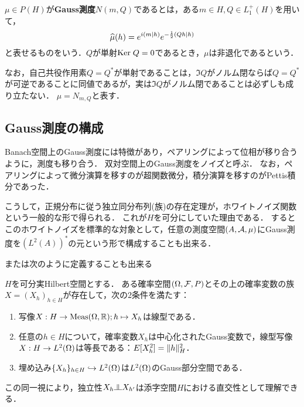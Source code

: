 \documentclass[uplatex,dvipdfmx]{jsreport}
\begin{document}
\begin{definition}
    $\mu\in P(H)$が\textbf{Gauss測度$N(m,Q)$}であるとは，ある$m\in H,Q\in L^+_1(H)$を用いて，
    \[\widehat{\mu}(h)=e^{i(m|h)}e^{-\frac{1}{2}(Qh|h)}\]
    と表せるものをいう．$Q$が単射$\mathrm{Ker}\; Q=0$であるとき，$\mu$は非退化であるという．

    なお，自己共役作用素$Q=Q^*$が単射であることは，$\Im Q$がノルム閉ならば$Q=Q^*$が可逆であることに同値であるが，実は$\Im Q$がノルム閉であることは必ずしも成り立たない．
    $\mu=N_{m,Q}$と表す．
\end{definition}

\subsection{Gauss測度の構成}

\begin{tcolorbox}[colframe=ForestGreen, colback=ForestGreen!10!white,breakable,colbacktitle=ForestGreen!40!white,coltitle=black,fonttitle=\bfseries\sffamily,
title=]
    Banach空間上のGauss測度には特徴があり，ペアリングによって位相が移り合うように，測度も移り合う．
    双対空間上のGauss測度をノイズと呼ぶ．
    なお，ペアリングによって微分演算を移すのが超関数微分，積分演算を移すのがPettis積分であった．

    こうして，正規分布に従う独立同分布列(族)の存在定理が，ホワイトノイズ関数という一般的な形で得られる．
    これが$H$を可分にしていた理由である．
    するとこのホワイトノイズを標準的な対象として，任意の測度空間$(A,\mathcal{A},\mu)$にGauss測度を$(L^2(A))^*$の元という形で構成することも出来る．
\end{tcolorbox}

または次のように定義することも出来る\cite{Revus and Yor}

\begin{proposition}\label{prop-existence-of-noises}
    $H$を可分実Hilbert空間とする．
    ある確率空間$(\Omega,\mathcal{F},P)$とその上の確率変数の族$X=(X_h)_{h\in H}$が存在して，次の2条件を満たす：
    \begin{enumerate}
        \item 写像$X:H\to\mathrm{Meas}(\Omega,\mathbb{R});h\mapsto X_h$は線型である．
        \item 任意の$h\in H$について，確率変数$X_h$は中心化されたGauss変数で，線型写像$X:H\to L^2(\Omega)$は等長である：$E[X_h^2]=\|h\|^2_H$．
        \item 埋め込み$\{X_h\}_{h\in H}\hookrightarrow L^2(\Omega)$は$L^2(\Omega)$のGauss部分空間である．
    \end{enumerate}
\end{proposition}
\begin{remark}
    この同一視により，独立性$X_h\indep X_{h'}$は添字空間$H$における直交性として理解できる．
\end{remark}
\end{document}
